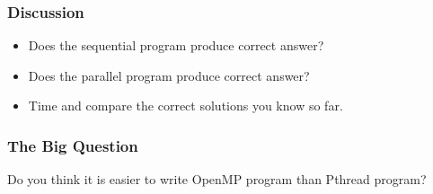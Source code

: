 \documentclass{beamer}
\begin{document}
\begin{frame}
\frametitle{Discussion}
\begin{itemize}
\item Does the sequential program produce correct answer?
\item Does the parallel program produce correct answer?
\item Time and compare the correct solutions you know so far.
\end{itemize}
\end{frame}



\begin{frame}
\frametitle{The Big Question} {\huge Do you think it is easier to
  write OpenMP program than Pthread program?}
\end{frame}
\end{document}
